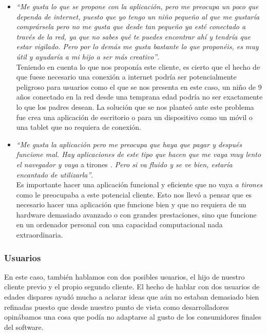 \documentclass[12pt,a4paper]{article}
\begin{document}
\begin{itemize}
    \item \textit{``Me gusta lo que se propone con la aplicación, pero me preocupa un poco que dependa de internet, puesto que yo tengo un niño pequeño al que me gustaría comprársela pero no me gusta que desde tan pequeño ya esté conectado a través de la red, ya que no sabes qué te puedes encontrar ahí y tendría que estar vigilado. Pero por lo demás me gusta bastante lo que proponéis, es muy útil y ayudaría a mi hijo a ser más creativo''}.\\
    
    Teniendo en cuenta lo que nos proponía este cliente, es cierto que el hecho de que fuese necesario una conexión a internet podría ser potencialmente peligroso para usuarios como el que se nos presenta en este caso, un niño de 9 años conectado en la red desde una temprana edad podría no ser exactamente lo que los padres desean. La solución que se nos planteó ante este problema fue crea una aplicación de escritorio o para un dispositivo como un móvil o una tablet que no requiera de conexión.\\
    
    \item \textit{``Me gusta la aplicación pero me preocupa que haya que pagar y después funcione mal. Hay aplicaciones de este tipo que hacen que me vaya muy lento el navegador y vaya} a tirones \textit{. Pero si va fluido y se ve bien, estaría encantado de utilizarla''}.\\
    
    Es importante hacer una aplicación funcional y eficiente que no vaya \textit{a tirones} como le preocupaba a este potencial cliente. Esto nos llevó a pensar que es necesario hacer una aplicación que funcione bien y que no requiera de un hardware demasiado avanzado o con grandes prestaciones, sino que funcione en un ordenador personal con una capacidad computacional nada extraordinaria.
\end{itemize}

\subsubsection{Usuarios}
En este caso, también hablamos con dos posibles usuarios, el hijo de nuestro cliente previo y el propio segundo cliente. El hecho de hablar con dos usuarios de edades dispares ayudó mucho a aclarar ideas que aún no estaban demasiado bien refinadas puesto que desde nuestro punto de vista como desarrolladores opinábamos una cosa que podía no adaptarse al gusto de los consumidores finales del software.
\end{document}
